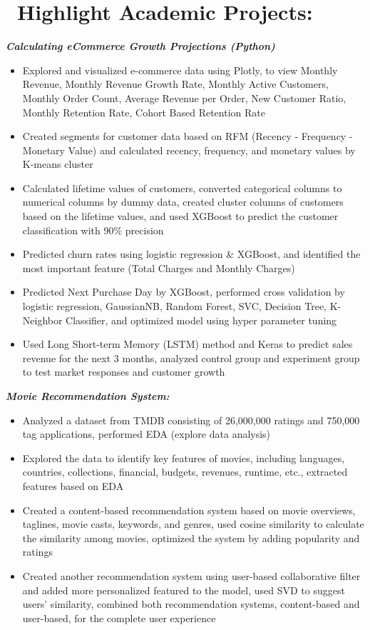 \documentclass{resume}
\begin{document}
\section{%
        \texorpdfstring{\faInfo\ Highlight Academic Projects:}%
                        {-{}--Projects}}
\textbf{\textit{Calculating eCommerce Growth Projections (Python) }}
\begin{itemize}
  \item Explored and visualized e-commerce data using Plotly, to view Monthly Revenue, Monthly Revenue Growth Rate, Monthly Active Customers, Monthly Order Count, Average Revenue per Order, New Customer Ratio, Monthly Retention Rate, Cohort Based Retention Rate
  \item Created segments for customer data based on RFM (Recency - Frequency - Monetary Value) and calculated recency, frequency, and monetary values by K-means cluster
  \item Calculated lifetime values of customers, converted categorical columns to numerical columns by dummy data, created cluster columns of customers based on the lifetime values, and used XGBoost to predict the customer classification with 90\% precision
  \item Predicted churn rates using logistic regression \& XGBoost, and identified the most important feature (Total Charges and Monthly Charges) 
  \item Predicted Next Purchase Day by XGBoost, performed cross validation by logistic regression, GaussianNB, Random Forest, SVC, Decision Tree, K-Neighbor Classifier, and optimized model using hyper parameter tuning 
  \item Used Long Short-term Memory (LSTM) method and Keras to predict sales revenue for the next 3 months, analyzed control group and experiment group to test market responses and customer growth
\end{itemize}

\textbf{\textit{Movie Recommendation System: }}
\begin{itemize}
  \item Analyzed a dataset from TMDB consisting of 26,000,000 ratings and 750,000 tag applications, performed EDA (explore data analysis) 
  \item Explored the data to identify key features of movies, including languages, countries, collections, financial, budgets, revenues, runtime, etc., extracted features based on EDA 
  \item Created a content-based recommendation system based on movie overviews, taglines, movie casts, keywords, and genres, used cosine similarity to calculate the similarity among movies, optimized the system by adding popularity and ratings
  \item Created another recommendation system using user-based collaborative filter and added more personalized featured to the model, used SVD to suggest users’ similarity, combined both recommendation systems, content-based and user-based, for the complete user experience
\end{itemize}
\end{document}
